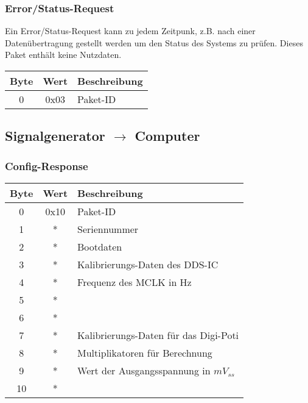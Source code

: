 \documentclass[a4paper,12pt]{article}
\begin{document}
\pagebreak
\subsubsection{Error/Status-Request}
Ein Error/Status-Request kann zu jedem Zeitpunk, z.B. nach einer Datenübertragung gestellt werden um den Status des Systems zu prüfen. Dieses Paket enthält keine Nutzdaten.

\begin{flushleft}
\begin{tabular}{c||c|l}
Byte & Wert & Beschreibung \\
\hline
\hline
0 & 0x03 & Paket-ID \\

\end{tabular}
\end{flushleft}


\subsection{Signalgenerator $\rightarrow$ Computer}

\subsubsection{Config-Response}

\begin{tabular}{c||c|l}
Byte & Wert & Beschreibung \\
\hline
\hline
0 & 0x10 & Paket-ID \\
\hline
1 & * & Seriennummer \\
\hline
2 & * & Bootdaten \\
\hline
3 & * & Kalibrierungs-Daten des DDS-IC \\
4 & * & Frequenz des MCLK in Hz \\
5 & * &  \\
6 & * &  \\
\hline
7 & * & Kalibrierungs-Daten für das Digi-Poti \\
8 & * & Multiplikatoren für Berechnung \\
\hline
9 & * & Wert der Ausgangsspannung in $mV_{ss}$ \\
10 & * & \\
\end{tabular}
\end{document}

